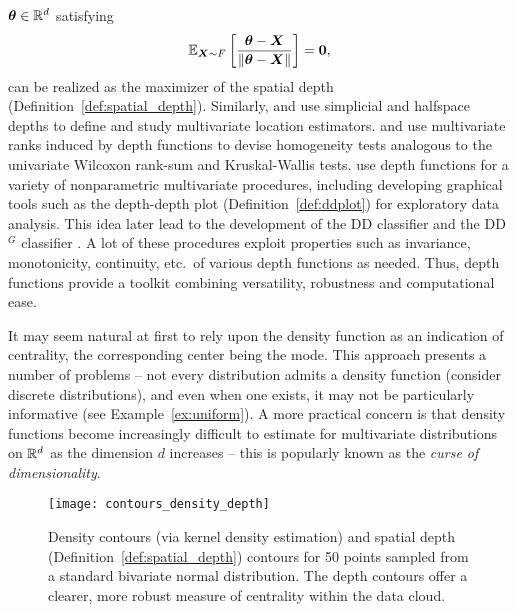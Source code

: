 $\bm{\theta} \in \mathbb{R}^d$ satisfying
\begin{equation}
    \operatorname{\mathbb{E}}_{\bm{X} \sim F}\left[\frac{\bm{\theta} - \bm{X}}{\Vert \bm{\theta} - \bm{X} \Vert}\right] = \bm{0},
\end{equation}
can be realized as the maximizer of the spatial depth
(Definition~\ref{def:spatial_depth}).
Similarly, \textcite{liu-1990} and \textcite{donoho-gasko-1992} use simplicial
and halfspace depths to define and study multivariate location estimators.
\textcite{liu-singh-1993} and \textcite{chenouri-small-2012} use multivariate
ranks induced by depth functions to devise homogeneity tests analogous to the
univariate Wilcoxon rank-sum and Kruskal-Wallis tests.
\textcite{liu-parelius-singh-1999} use depth functions for a variety of
nonparametric multivariate procedures, including developing graphical tools
such as the depth-depth plot (Definition~\ref{def:ddplot}) for exploratory
data analysis.
This idea later lead to the development of the DD classifier
\parencite{li-albertos-liu-2012} and the DD$^G$
classifier \parencite{albertos-bande-fuente-2017}.
A lot of these procedures exploit properties such as invariance, monotonicity,
continuity, etc.\ of various depth functions as needed.
Thus, depth functions provide a toolkit combining versatility, robustness and
computational ease.


It may seem natural at first to rely upon the density function as an
indication of centrality, the corresponding center being the mode.
This approach presents a number of problems -- not every distribution admits a
density function (consider discrete distributions), and even when one exists,
it may not be particularly informative (see Example~\ref{ex:uniform}).
A more practical concern is that density functions become increasingly
difficult to estimate for multivariate distributions on $\mathbb{R}^d$ as the
dimension $d$ increases -- this is popularly known as the \emph{curse of
dimensionality}.

\begin{figure}
    \centering
    \texttt{[image: contours\_density\_depth]}
    \caption{
        Density contours (via kernel density estimation) and spatial depth
        (Definition~\ref{def:spatial_depth}) contours for 50 points sampled
        from a standard bivariate normal distribution.
        The depth contours offer a clearer, more robust measure of centrality
        within the data cloud.
    }
    \label{fig:contours_density_depth}
\end{figure}


